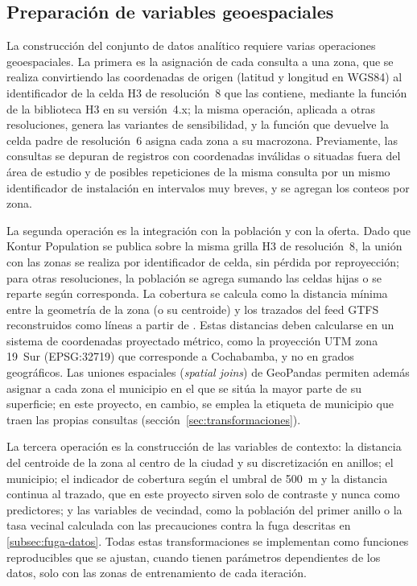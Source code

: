 \subsection{Preparación de variables geoespaciales}
\label{subsec:preparacion-geoespacial}

La construcción del conjunto de datos analítico requiere varias operaciones geoespaciales.
La primera es la asignación de cada consulta a una zona, que se realiza convirtiendo las
coordenadas de origen (latitud y longitud en WGS84) al identificador de la celda H3 de
resolución~8 que las contiene, mediante la función  de la biblioteca H3
en su versión~4.x; la misma operación, aplicada a otras resoluciones, genera las variantes de
sensibilidad, y la función que devuelve la celda padre de resolución~6 asigna cada zona a su
macrozona. Previamente, las consultas se depuran de registros con coordenadas inválidas o
situadas fuera del área de estudio y de posibles repeticiones de la misma consulta por un
mismo identificador de instalación en intervalos muy breves, y se agregan los conteos por
zona.

La segunda operación es la integración con la población y con la oferta. Dado que Kontur
Population se publica sobre la misma grilla H3 de resolución~8, la unión con las zonas se
realiza por identificador de celda, sin pérdida por reproyección; para otras resoluciones,
la población se agrega sumando las celdas hijas o se reparte según corresponda. La cobertura
se calcula como la distancia mínima entre la geometría de la zona (o su centroide) y los
trazados del feed GTFS reconstruidos como líneas a partir de . Estas
distancias deben calcularse en un sistema de coordenadas proyectado métrico, como la
proyección UTM zona 19~Sur (EPSG:32719) que corresponde a Cochabamba, y no en grados
geográficos. Las uniones espaciales (\textit{spatial joins}) de GeoPandas permiten además
asignar a cada zona el municipio en el que se sitúa la mayor parte de su superficie; en este
proyecto, en cambio, se emplea la etiqueta de municipio que traen las propias consultas
(sección~\ref{sec:transformaciones}).

La tercera operación es la construcción de las variables de contexto: la distancia del
centroide de la zona al centro de la ciudad y su discretización en anillos; el municipio; el
indicador de cobertura según el umbral de 500~m y la distancia continua al trazado, que en este
proyecto sirven solo de contraste y nunca como predictores; y las
variables de vecindad, como la población del primer anillo o la tasa vecinal calculada con
las precauciones contra la fuga descritas en \ref{subsec:fuga-datos}. Todas estas
transformaciones se implementan como funciones reproducibles que se ajustan, cuando tienen
parámetros dependientes de los datos, solo con las zonas de entrenamiento de cada
iteración.

